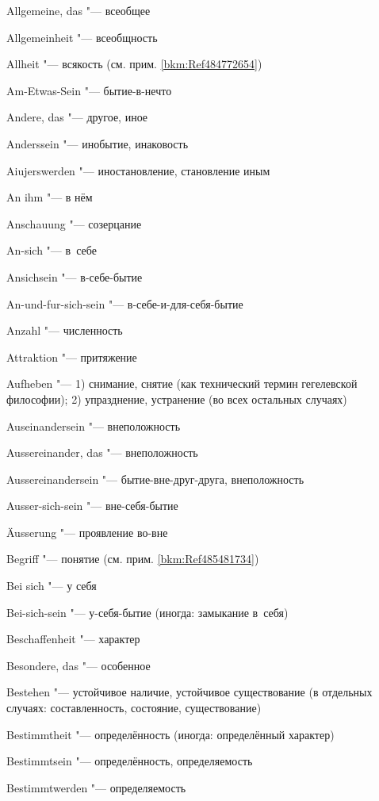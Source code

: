 \bigskip

\begin{multicols}{2}
Allgemeine, das "--- всеобщее

Allgemein\-heit "--- всеобщность

Allheit "--- всякость (см. прим. \ref{bkm:Ref484772654})

Am-Etwas-Sein "--- бытие-в-нечто

Andere, das "--- другое, иное

Anderssein "--- инобытие, инаковость

Aiujers\-werden "--- иностановление, становление иным

An ihm "--- в нём

Anschauung "--- созерцание

An-sich "--- в~себе

Ansichsein "--- в-себе-бытие

An-und-fur-sich-sein "--- в-себе-и-для-себя-бытие

Anzahl "--- численность

Attraktion "--- притяжение

Aufheben "--- 1) снимание, снятие (как технический термин гегелевской
философии); 2) упразднение, устранение (во всех остальных случаях)

Ausein\-ander\-sein "--- внеположность

Ausser\-ein\-ander, das "--- внеположность

Ausser\-ein\-ander\-sein "--- бытие-вне-друг-друга, внеположность

Ausser-sich-sein "--- вне-себя-бытие

Äusserung "--- проявление во-вне

\bigskip

Begriff "--- понятие (см. прим. \ref{bkm:Ref485481734})

Bei sich "--- у себя

Bei-sich-sein "--- у-себя-бытие (иногда: замыкание в~себя)

Beschaffen\-heit "--- характер

Besondere, das "--- особенное

Bestehen "--- устойчивое наличие, устойчивое существование (в
отдельных случаях: составленность, состояние, существование)

Bestimmt\-heit "--- определённость (иногда: определённый характер)

Bestimmt\-sein "--- определённость, определяемость

Bestimmt\-werden "--- определяемость


\end{multicols}
